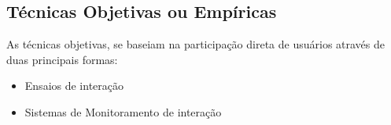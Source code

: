 \subsection{Técnicas Objetivas ou Empíricas}

As técnicas objetivas, se baseiam na participação direta de usuários através de duas principais formas:

\begin{itemize}
    \item Ensaios de interação
    \item Sistemas de Monitoramento de interação
\end{itemize}


